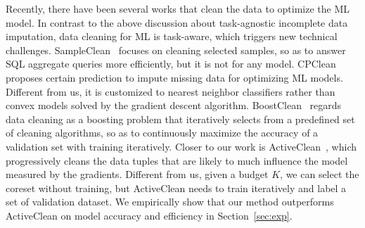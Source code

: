  Recently, there have  been several works that clean the data to optimize the ML model. 
In contrast to the above discussion about task-agnostic incomplete data imputation, data cleaning for ML is task-aware, which triggers new technical challenges.
SampleClean~\cite{DBLP:journals/debu/KrishnanWFGKM015} focuses on cleaning selected samples, so as to answer  SQL aggregate  queries  more efficiently, but it is not for any model.
%
 CPClean~\cite{DBLP:journals/pvldb/KarlasLWGC0020} proposes certain prediction to impute missing data for optimizing ML models. Different from us, it is customized to nearest neighbor classifiers rather than convex models solved by the gradient descent algorithm. 
  BoostClean~\cite{DBLP:journals/corr/abs-1711-01299} regards data cleaning as a boosting problem that iteratively
 selects from a predefined set of cleaning algorithms, so as to continuously maximize the accuracy of  a validation set with training iteratively. 
Closer to our work is ActiveClean~\cite{DBLP:journals/pvldb/KrishnanWWFG16}, which progressively cleans the data tuples that are likely to much influence the model   measured by the gradients. 
Different from us,  given a budget $K$, we can select the coreset without training, but ActiveClean needs to train iteratively  and label a set of   validation  dataset.  We empirically show that our method outperforms ActiveClean on model accuracy and efficiency in Section~\ref{sec:exp}.



